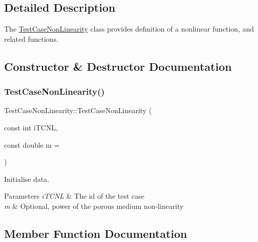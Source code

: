 \subsection{Detailed Description}
The \hyperlink{classTestCaseNonLinearity}{Test\+Case\+Non\+Linearity} class provides definition of a nonlinear function, and related functions. 

\subsection{Constructor \& Destructor Documentation}
\mbox{\label{classTestCaseNonLinearity_a490a6f0868a2edd9ecd6a88aaaca1ddb}} 
\subsubsection{\texorpdfstring{Test\+Case\+Non\+Linearity()}{TestCaseNonLinearity()}}
{\footnotesize\ttfamily Test\+Case\+Non\+Linearity\+::\+Test\+Case\+Non\+Linearity (\begin{DoxyParamCaption}\item[{const int}]{i\+T\+C\+NL,  }\item[{const double}]{m = {} }\end{DoxyParamCaption})}



Initialise data. 


\begin{DoxyParams}{Parameters}
{\em i\+T\+C\+NL} & The id of the test case \\
\hline
{\em m} & Optional, power of the porous medium non-\/linearity \\
\hline
\end{DoxyParams}


\subsection{Member Function Documentation}
\mbox{\label{classTestCaseNonLinearity_a62249600985bb7532fe498680b38f38a}} 
